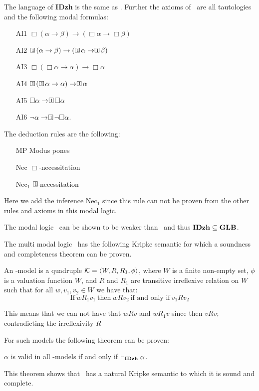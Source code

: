 \documentclass[../main.tex]{subfiles}
\begin{document}
\begin{defi}
	The language of \textbf{IDzh} is the same as \GLB. Further the axioms
	of \IDzh\ are all tautologies and the following modal formulas:
	\begin{enumerate}
		\item[AI1]
			$\Box(\alpha\rightarrow\beta)\rightarrow(\Box\alpha\rightarrow\Box\beta)$
		\item[AI2]
			$\OneBox(\alpha\rightarrow\beta)\rightarrow(\OneBox\alpha\rightarrow\OneBox\beta)$
		\item[AI3] $\Box(\Box\alpha\rightarrow\alpha)\rightarrow\Box\alpha$
		\item[AI4] $\OneBox(\OneBox\alpha\rightarrow\alpha)\rightarrow\OneBox\alpha$
		\item[AI5] $\Box\alpha\rightarrow\OneBox\Box\alpha$
		\item[AI6] $\neg\alpha\rightarrow\OneBox\neg\Box\alpha$.
	\end{enumerate}
	The deduction rules are the following:
	\begin{enumerate}
		\item[MP] Modus pones 
		\item[Nec] $\Box$-necessitation
		\item[Nec$_1$] $\OneBox$-necessitation
	\end{enumerate}
	Here we add the inference Nec$_1$ since this rule can not be proven
	from the other rules and axioms in this modal logic.
\end{defi}
The modal logic \IDzh\ can be shown to be weaker than \GLB\ and thus
$\text{\textbf{IDzh}}\subseteq\text{\textbf{GLB}}$.

The multi modal logic \IDzh\ has the following Kripke semantic for which a soundness and
completeness theorem can be proven.
\begin{defi}
	An \IDzh-model is a quadruple $\mathcal{K}=\langle W,R,R_1,\phi\rangle$, where
	$W$ is a finite non-empty set, $\phi$ is a valuation function $W$, and
	$R$ and $R_1$ are transitive irreflexive relation on $W$ such that for
	all $w,v_1,v_2\in W$ we have that:
	\[\text{If}\ wR_1v_1\ \text{then}\ wRv_2\ \text{if and only if}\
	v_1Rv_2\]
\end{defi}
This means that we can not have that $wRv$ and $wR_1v$ since then $vRv$;
contradicting the irreflexivity $R$

For such models the following theorem can be proven:
\begin{thm}
	$\alpha$ is valid in all \IDzh-models if and only if
	$\vdash_{\text{\textbf{IDzh}}}\alpha$.
\end{thm}
This theorem shows that \IDzh\ has a natural Kripke semantic to which it is
sound and complete.
\end{document}

